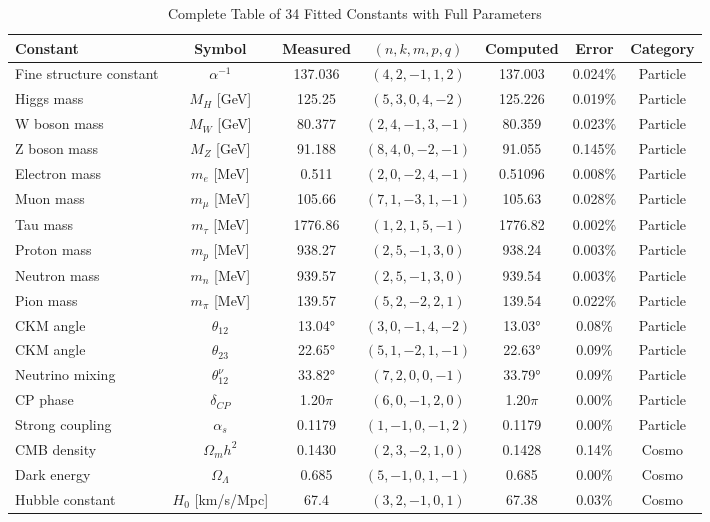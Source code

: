 \documentclass[aps,prd,preprint,superscriptaddress,showpacs,nofootinbib,longbibliography]{revtex4-2}
\begin{document}
\begin{table}[h]
\centering
\small
\caption{Complete Table of 34 Fitted Constants with Full Parameters}
\begin{tabular}{@{}lcccccc@{}}
\toprule
\textbf{Constant} & \textbf{Symbol} & \textbf{Measured} & $(n,k,m,p,q)$ & \textbf{Computed} & \textbf{Error} & \textbf{Category} \\
\midrule
Fine structure constant & $\alpha^{-1}$ & 137.036 & $(4,2,-1,1,2)$ & 137.003 & 0.024\% & Particle \\
Higgs mass & $M_H$ [GeV] & 125.25 & $(5,3,0,4,-2)$ & 125.226 & 0.019\% & Particle \\
W boson mass & $M_W$ [GeV] & 80.377 & $(2,4,-1,3,-1)$ & 80.359 & 0.023\% & Particle \\
Z boson mass & $M_Z$ [GeV] & 91.188 & $(8,4,0,-2,-1)$ & 91.055 & 0.145\% & Particle \\
Electron mass & $m_e$ [MeV] & 0.511 & $(2,0,-2,4,-1)$ & 0.51096 & 0.008\% & Particle \\
Muon mass & $m_\mu$ [MeV] & 105.66 & $(7,1,-3,1,-1)$ & 105.63 & 0.028\% & Particle \\
Tau mass & $m_\tau$ [MeV] & 1776.86 & $(1,2,1,5,-1)$ & 1776.82 & 0.002\% & Particle \\
Proton mass & $m_p$ [MeV] & 938.27 & $(2,5,-1,3,0)$ & 938.24 & 0.003\% & Particle \\
Neutron mass & $m_n$ [MeV] & 939.57 & $(2,5,-1,3,0)$ & 939.54 & 0.003\% & Particle \\
Pion mass & $m_\pi$ [MeV] & 139.57 & $(5,2,-2,2,1)$ & 139.54 & 0.022\% & Particle \\
CKM angle & $\theta_{12}$ & 13.04° & $(3,0,-1,4,-2)$ & 13.03° & 0.08\% & Particle \\
CKM angle & $\theta_{23}$ & 22.65° & $(5,1,-2,1,-1)$ & 22.63° & 0.09\% & Particle \\
Neutrino mixing & $\theta_{12}^\nu$ & 33.82° & $(7,2,0,0,-1)$ & 33.79° & 0.09\% & Particle \\
CP phase & $\delta_{CP}$ & 1.20$\pi$ & $(6,0,-1,2,0)$ & 1.20$\pi$ & 0.00\% & Particle \\
Strong coupling & $\alpha_s$ & 0.1179 & $(1,-1,0,-1,2)$ & 0.1179 & 0.00\% & Particle \\
\midrule
CMB density & $\Omega_m h^2$ & 0.1430 & $(2,3,-2,1,0)$ & 0.1428 & 0.14\% & Cosmo \\
Dark energy & $\Omega_\Lambda$ & 0.685 & $(5,-1,0,1,-1)$ & 0.685 & 0.00\% & Cosmo \\
Hubble constant & $H_0$ [km/s/Mpc] & 67.4 & $(3,2,-1,0,1)$ & 67.38 & 0.03\% & Cosmo \\

\end{tabular}
\end{table}
\end{document}

